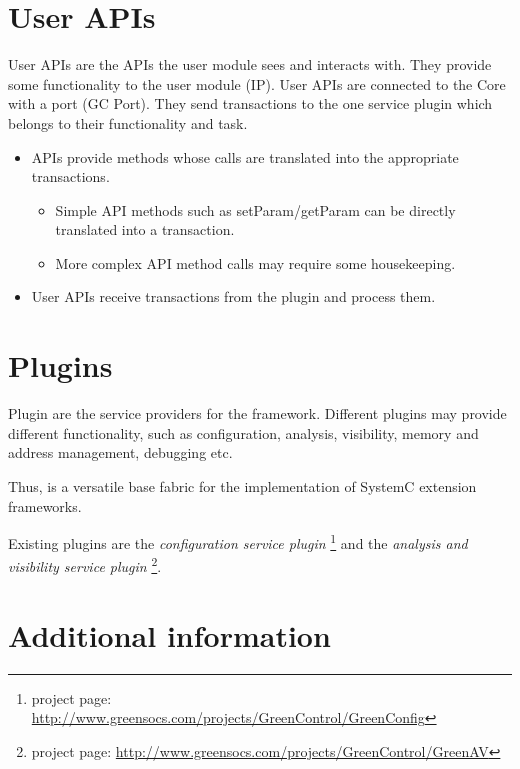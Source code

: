 \section{User APIs}
User APIs are the APIs the user module sees and interacts with. They provide some functionality to the user module (IP). User APIs are connected to the \GreenControl Core with a port (GC Port). They send transactions to the one service plugin which belongs to their functionality and task.

\begin{itemize}
	\item APIs provide methods whose calls are translated into the appropriate \GreenControl transactions. 
	\begin{itemize}
		\item Simple API methods such as setParam/getParam can be directly translated into a transaction.
		\item More complex API method calls may require some housekeeping.
	\end{itemize}

	\item User APIs receive transactions from the plugin and process them.
\end{itemize}


\section{Plugins}
Plugin are the service providers for the \GreenControl framework. Different plugins may provide different functionality, such as configuration, analysis, visibility, memory and address management, debugging etc.

Thus, \GreenControl is a versatile base fabric for the implementation of SystemC extension frameworks.

Existing plugins are the {\em configuration service plugin} \GreenConfig\footnote{\GreenConfig project page:  \href{http://www.greensocs.com/projects/GreenControl/GreenConfig}{http://www.greensocs.com/projects/GreenControl/GreenConfig}} and the {\em analysis and visibility service plugin} \GreenAV\footnote{\GreenAV project page:  \href{http://www.greensocs.com/projects/GreenControl/GreenAV}{http://www.greensocs.com/projects/GreenControl/GreenAV}}. 



\section{Additional information}

